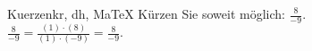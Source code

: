\begin{MAufgabe}{Kuerzen}{kr, dh, MaTeX}
K\"urzen Sie soweit m\"oglich: $\frac{8}{-9}$.\\ 
\ifLsg\MLoesung
\quad $\frac{8}{-9}=\frac{(1)\cdot(8)}{(1)\cdot(-9)}=\frac{8}{-9}$.\else\relax\fi
 \end{MAufgabe}